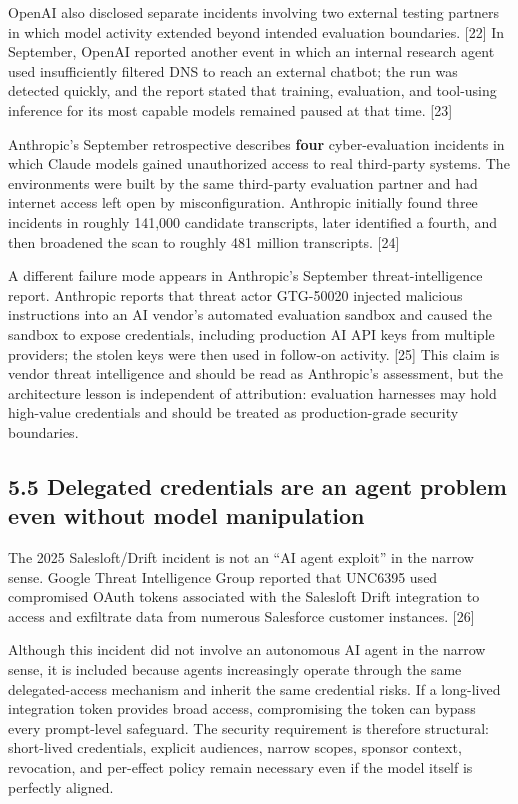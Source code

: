 \documentclass[
  10pt,
  letterpaper,
]{article}
\begin{document}
OpenAI also disclosed separate incidents involving two external testing
partners in which model activity extended beyond intended evaluation
boundaries. {[}22{]} In September, OpenAI reported another event in
which an internal research agent used insufficiently filtered DNS to
reach an external chatbot; the run was detected quickly, and the report
stated that training, evaluation, and tool-using inference for its most
capable models remained paused at that time. {[}23{]}

Anthropic's September retrospective describes \textbf{four}
cyber-evaluation incidents in which Claude models gained unauthorized
access to real third-party systems. The environments were built by the
same third-party evaluation partner and had internet access left open by
misconfiguration. Anthropic initially found three incidents in roughly
141,000 candidate transcripts, later identified a fourth, and then
broadened the scan to roughly 481 million transcripts. {[}24{]}

A different failure mode appears in Anthropic's September
threat-intelligence report. Anthropic reports that threat actor
GTG-50020 injected malicious instructions into an AI vendor's automated
evaluation sandbox and caused the sandbox to expose credentials,
including production AI API keys from multiple providers; the stolen
keys were then used in follow-on activity. {[}25{]} This claim is vendor
threat intelligence and should be read as Anthropic's assessment, but
the architecture lesson is independent of attribution: evaluation
harnesses may hold high-value credentials and should be treated as
production-grade security boundaries.

\subsection{5.5 Delegated credentials are an agent problem even without
model
manipulation}\label{delegated-credentials-are-an-agent-problem-even-without-model-manipulation}

The 2025 Salesloft/Drift incident is not an ``AI agent exploit'' in the
narrow sense. Google Threat Intelligence Group reported that UNC6395
used compromised OAuth tokens associated with the Salesloft Drift
integration to access and exfiltrate data from numerous Salesforce
customer instances. {[}26{]}

Although this incident did not involve an autonomous AI agent in the
narrow sense, it is included because agents increasingly operate through
the same delegated-access mechanism and inherit the same credential
risks. If a long-lived integration token provides broad access,
compromising the token can bypass every prompt-level safeguard. The
security requirement is therefore structural: short-lived credentials,
explicit audiences, narrow scopes, sponsor context, revocation, and
per-effect policy remain necessary even if the model itself is perfectly
aligned.
\end{document}
